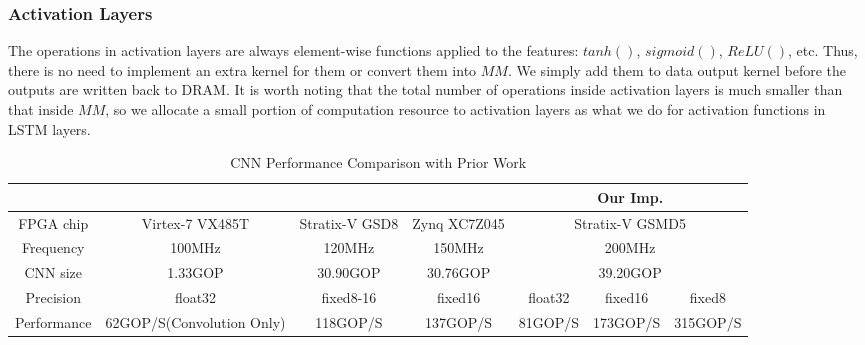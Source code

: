 \documentclass{acm_proc_article-sp-copy}
\begin{document}
\subsubsection{Activation Layers}

The operations in activation layers are always element-wise functions applied to the features: $tanh()$, $sigmoid()$, $ReLU()$, etc. Thus, there is no need to implement an extra kernel for them or convert them into $MM$. We simply add them to data output kernel before the outputs are written back to DRAM. It is worth noting that the total number of operations inside activation layers is much smaller than that inside $MM$, so we allocate a small portion of computation resource to activation layers as what we do for activation functions in LSTM layers.

\begin{table}[!htb]
	\centering
	\begin{tabular}{|c|c|c|c|c|c|c|}
		\hline
		& \cite{fpga'15} & \cite{fpga'16} & \cite{aeye} &  \multicolumn{3}{|c|}{Our Imp.}\\
		\hline
		FPGA chip & Virtex-7 VX485T& Stratix-V GSD8 & Zynq XC7Z045 & \multicolumn{3}{|c|}{Stratix-V GSMD5}\\
		\hline
		Frequency & 100MHz & 120MHz & 150MHz & \multicolumn{3}{|c|}{200MHz}\\
		\hline
		CNN size & 1.33GOP & 30.90GOP & 30.76GOP & \multicolumn{3}{|c|}{39.20GOP}\\
		\hline
		Precision & float32 & fixed8-16 & fixed16 &  float32 & fixed16 & fixed8\\		
		\hline
		Performance & 62GOP/S(Convolution Only) & 118GOP/S & 137GOP/S & 81GOP/S & 173GOP/S & 315GOP/S \\
		\hline
	\end{tabular}
	\caption{CNN Performance Comparison with Prior Work}
	\label{cnn}
\end{table}
\end{document}
